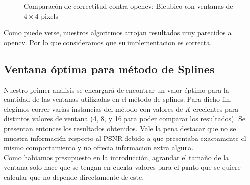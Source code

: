 \begin{figure}[H]
    \centering
    \qquad
    \caption{Comparacón de correctitud contra opencv: Bicubico con ventanas de $4\times4$ pixels}
\end{figure}

Como puede verse, nuestros algoritmos arrojan resultados muy parecidos a opencv. Por lo que consideramos que su implementacion es correcta.

\subsection{Ventana óptima para método de Splines}
Nuestro primer análisis se encargará de encontrar un valor óptimo para la cantidad de las ventanas utilizadas en el método de splines.
Para dicho fin, elegimos correr varias instancias del método con valores de $K$ crecientes para distintos valores de ventana (4, 8, y 16 para poder comparar los resultados). Se presentan entonces los resultados obtenidos. Vale la pena destacar que no se muestra información respecto al PSNR debido a que presentaba exactamente el mismo comportamiento y no ofrecia informacion extra alguna.
\\
Como habiamos presupuesto en la introducción, agrandar el tamaño de la ventana solo hace que se tengan en cuenta valores para el punto que se quiere calcular que no depende directamente de este. 

